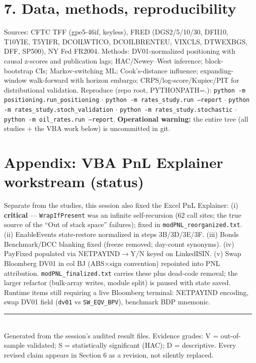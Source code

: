 \documentclass[10pt,a4paper]{article}
\newcommand{\sect}[1]{\section*{\color{bigorange}#1}}
\begin{document}
\sect{7. Data, methods, reproducibility}
Sources: CFTC TFF (gpe5-46if, keyless), FRED (DGS2/5/10/30, DFII10, T10YIE, T5YIFR,
DCOILWTICO, DCOILBRENTEU, VIXCLS, DTWEXBGS, DFF, SP500), NY Fed FR2004. Methods:
DV01-normalized positioning with causal z-scores and publication lags; HAC/Newey--West
inference; block-bootstrap CIs; Markov-switching ML; Cook's-distance influence;
expanding-window walk-forward with horizon embargo; CRPS/log-score/Kupiec/PIT for
distributional validation. Reproduce (repo root, PYTHONPATH=.):
\texttt{python -m positioning.run\_positioning} $\cdot$
\texttt{python -m rates\_study.run --report} $\cdot$
\texttt{python -m rates\_study.stoch\_validation} $\cdot$
\texttt{python -m rates\_study.stochastic} $\cdot$
\texttt{python -m oil\_rates.run --report}.
\textbf{Operational warning:} the entire tree (all studies + the VBA work below) is
uncommitted in git.

\sect{Appendix: VBA PnL Explainer workstream (status)}
Separate from the studies, this session also fixed the Excel PnL Explainer:
(i) \textbf{critical} --- \texttt{WrapIfPresent} was an infinite self-recursion (62 call
sites; the true source of the ``Out of stack space'' failures); fixed in
\texttt{modPNL\_reorganized.txt}. (ii) EnableEvents state-restore normalized in steps
3B/3D/3E/3F. (iii) Bonds Benchmark/DCC blanking fixed (freeze removed; day-count synonyms).
(iv) PayFixed populated via NETPAYIND$\to$Y/N keyed on LinkedISIN. (v) Swap Bloomberg
DV01 in col BJ (ABS$\times$sign convention) repointed into PNL attribution.
\texttt{modPNL\_finalized.txt} carries these plus dead-code removal; the larger
refactor (bulk-array writes, module split) is paused with state saved. Runtime items
still requiring a live Bloomberg terminal: NETPAYIND encoding, swap DV01 field
(\texttt{dv01} vs \texttt{SW\_EQV\_BPV}), benchmark BDP mnemonic.

\vspace{6pt}
{\footnotesize\color{biggrey}\rule{\textwidth}{0.6pt}\\
Generated from the session's audited result files. Evidence grades:
V = out-of-sample validated; S = statistically significant (HAC); D = descriptive.
Every revised claim appears in Section 6 as a revision, not silently replaced.}
\end{document}
